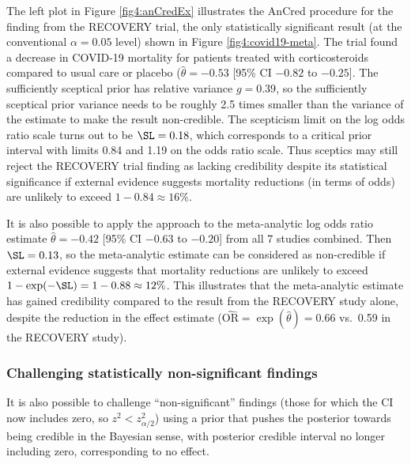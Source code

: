 The left plot in Figure \ref{fig4:anCredEx} illustrates the AnCred procedure for
the finding from the RECOVERY trial, the only statistically significant result
(at the conventional $\alpha=0.05$ level) shown in Figure
\ref{fig4:covid19-meta}. The trial found a decrease in COVID-19 mortality for
patients treated with corticosteroids compared to usual care or placebo
($\hat{\theta} = -0.53$ [95\% CI $-0.82$ to $-0.25$]. The sufficiently sceptical
prior has relative variance $g = 0.39$, so the sufficiently sceptical prior
variance needs to be roughly 2.5 times smaller than the variance of the estimate
to make the result non-credible. The scepticism limit on the log odds ratio
scale turns out to be $\SL=0.18$, which corresponds to a critical prior interval
with limits 0.84 and 1.19 on the odds ratio scale. Thus sceptics may still
reject the RECOVERY trial finding as lacking credibility despite its statistical
significance if external evidence suggests mortality reductions (in terms of
odds) are unlikely to exceed $1 - 0.84 \approx 16 \%$.


It is also possible to apply the approach to the meta-analytic log odds ratio
estimate $\hat \theta = -0.42$ [95\% CI $-0.63$ to $-0.20$] from all 7 studies
combined. Then $\SL= 0.13$, so the meta-analytic estimate can be considered as
non-credible if external evidence suggests that mortality reductions are
unlikely to exceed $1-\exp(-\SL)=1 - 0.88 \approx 12 \%$. This illustrates that
the meta-analytic estimate has gained credibility compared to the result from
the RECOVERY study alone, despite the reduction in the effect estimate
($\widehat{\text{OR}} = \exp(\hat \theta) = 0.66$ vs.~0.59 in the RECOVERY
study).

\subsubsection{Challenging statistically non-significant findings}
\label{sec4:nonSigAnCred}
It is also possible to challenge ``non-significant'' findings (\ie those for
which the CI now includes zero, so $z^2 < z_{\alpha/2}^2$) using a prior that
pushes the posterior towards being credible in the Bayesian sense, with
posterior credible interval no longer including zero, corresponding to no
effect.

